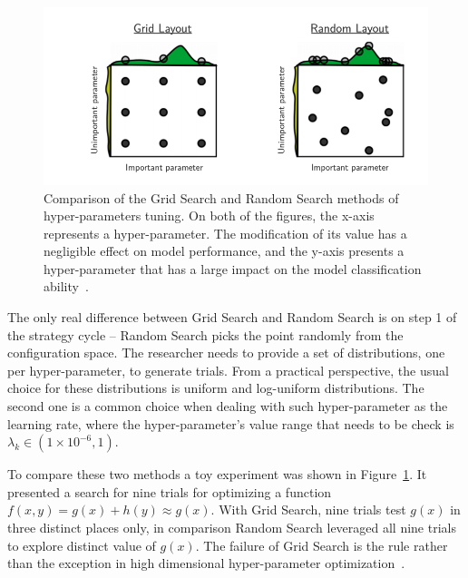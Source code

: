 \begin{figure}
\centering
\includegraphics{figures/GridSearch.png}
\caption{Comparison of the Grid Search and Random Search methods of hyper-parameters tuning. 
On both of the figures, the x-axis represents a hyper-parameter. The modification of its value has a negligible effect on model performance, and the y-axis presents a hyper-parameter that has a large impact on the model classification ability~\cite{RandomSearch}. 
\label{fig:GridSearch}}
\end{figure} 

The only real difference between Grid Search and Random Search is on step 1 of the strategy cycle – Random Search picks the point randomly from the configuration space. 
The researcher needs to provide a set of distributions, one per hyper-parameter, to generate trials. From a practical perspective, the usual choice for these distributions is uniform and log-uniform distributions. The second one is a common choice when dealing with such hyper-parameter as the learning rate, where the hyper-parameter's value range that needs to be check is   $ \lambda_k \in (1\times 10^{-6},1)$. 


To compare these two methods a toy experiment was shown in Figure~\ref{fig:GridSearch}. It presented a search for nine trials for optimizing a function \\ $f(x,y) = g(x) + h(y) \approx g(x)$. With Grid Search, nine trials test $g(x)$ in three distinct places only, in comparison Random Search leveraged all nine trials to explore distinct value of $g(x)$. The failure of Grid Search is the rule rather than the exception in high dimensional hyper-parameter optimization~\cite{RandomSearch}. 

